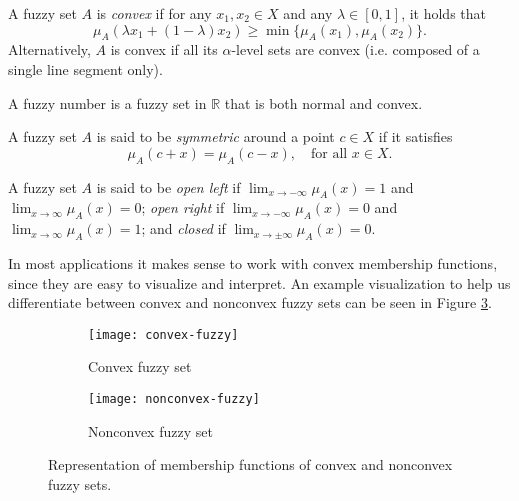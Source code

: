 \begin{definition}[Convexity] A fuzzy set $A$ is \textit{convex} if for any $x_1,x_2 \in X$ and any $\lambda \in [0,1]$, it holds that
\[
\mu_A(\lambda x_1 + (1-\lambda)x_2) \ge \min{\{ \mu_A(x_1), \mu_A(x_2)\}}.
\]
Alternatively, $A$ is convex if all its $\alpha$-level sets are convex (i.e. composed of a single line segment only).
\end{definition}

\begin{definition} A fuzzy number is a fuzzy set in $\mathbb{R}$ that is both normal and convex.
\end{definition}

\begin{definition}[Symmetry] A fuzzy set $A$ is said to be \textit{symmetric} around a point $c \in X$ if it satisfies
\[
\mu_A(c + x) = \mu_A(c - x), \quad \text{for all } x \in X.
\]

\end{definition}

\begin{definition} A fuzzy set $A$ is said to be \textit{open left} if $\displaystyle \lim_{x \to -\infty} \mu_A(x) = 1$ and $\displaystyle\lim_{x \to \infty} \mu_A(x) = 0$; \textit{open right} if $\displaystyle\lim_{x \to -\infty} \mu_A(x) = 0$ and $\displaystyle\lim_{x \to \infty} \mu_A(x) = 1$; and \textit{closed} if $\displaystyle\lim_{x \to \pm \infty} \mu_A(x) = 0$.

\end{definition}

In most applications it makes sense to work with convex membership functions, since they are easy to visualize and interpret. An example visualization to help us differentiate between convex and nonconvex fuzzy sets can be seen in Figure \ref{fig:convex-fuzzy}.
\begin{figure}[h!]
\centering
\begin{subfigure}{.4\textwidth}
  \centering
  \texttt{[image: convex-fuzzy]}
  \caption{Convex fuzzy set}
  \label{fig:sub-first}
\end{subfigure}
\begin{subfigure}{.4\textwidth}
  \centering
  \texttt{[image: nonconvex-fuzzy]}
  \caption{Nonconvex fuzzy set}
  \label{fig:sub-second}
\end{subfigure}
\caption{Representation of membership functions of convex and nonconvex fuzzy sets.}
\label{fig:convex-fuzzy}
\end{figure}


